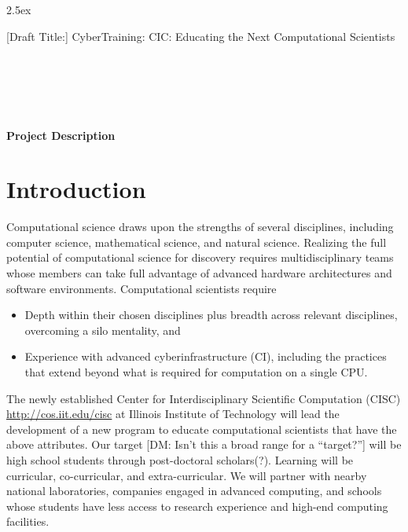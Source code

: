\documentclass[11pt]{NSFamsart}
\begin{document}
\leftmargini2.5ex %

[Draft Title:]  	CyberTraining: CIC:  Educating the Next Computational Scientists

\noindent
{}\\
 \\
 \\
 \\

\bigskip


\bigskip

\centerline{\Large \textbf{Project Description}}
\vspace{-2ex}

\setcounter{tocdepth}{1}
\tableofcontents %

\vspace{-6ex}

\section{Introduction}
Computational science draws upon the strengths of several disciplines, including computer science, mathematical science, and natural science.  Realizing the full potential of computational science for discovery requires multidisciplinary teams whose members can take full advantage of advanced hardware architectures and software environments.  Computational scientists require

\begin{itemize}
\item Depth within their chosen disciplines plus breadth across relevant disciplines, overcoming a silo mentality, and
\item Experience with advanced cyberinfrastructure (CI), including the practices that extend beyond what is required for computation on a single CPU.
\end{itemize}

The newly established Center for Interdisciplinary Scientific Computation (CISC) \url{http://cos.iit.edu/cisc} at Illinois Institute of Technology will lead the development of a new program to educate computational scientists that have the above attributes.  Our target {\color{green}[DM: Isn't this a broad range for a ``target?'']} will be high school students through post-doctoral scholars(?).  Learning will be curricular, co-curricular, and extra-curricular.  We will partner with nearby national laboratories, companies engaged in advanced computing, and schools whose students have less access to research experience and high-end computing facilities.
\end{document}
